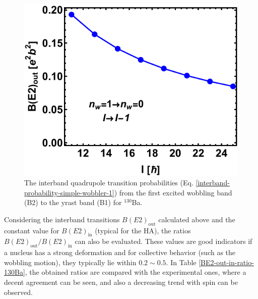 \begin{figure}
    \centering
    \includegraphics[scale=0.75]{Chapters/Figures/BE2-out-130Ba.pdf}
    \caption{The interband quadrupole transition probabilities (Eq. \ref{interband-probability-simple-wobbler-1}) from the first excited wobbling band (B2) to the yrast band (B1) for $^{130}$Ba.}
    \label{BE2out-transitions-130ba}
\end{figure}

Considering the interband transitions $B(E2)_\text{out}$ calculated above and the constant value for $B(E2)_\text{in}$ (typical for the HA), the ratios $B(E2)_\text{out}/B(E2)_\text{in}$ can also be evaluated. These values are good indicators if a nucleus has a strong deformation and for collective behavior (such as the wobbling motion), they typically lie within $0.2\sim 0.5$. In Table \ref{BE2-out-in-ratio-130Ba}, the obtained ratios are compared with the experimental ones, where a decent agreement can be seen, and also a decreasing trend with spin can be observed.

